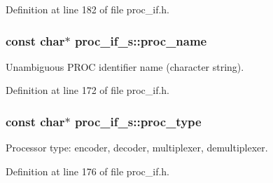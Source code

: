 Definition at line 182 of file proc\+\_\+if.\+h.

\subsubsection[{\texorpdfstring{proc\+\_\+name}{proc_name}}]{\setlength{\rightskip}{0pt plus 5cm}const char$\ast$ proc\+\_\+if\+\_\+s\+::proc\+\_\+name}\hypertarget{structproc__if__s_aa284f1d0bdde2fae0b51101f658430ee}{}\label{structproc__if__s_aa284f1d0bdde2fae0b51101f658430ee}
Unambiguous P\+R\+OC identifier name (character string). 

Definition at line 172 of file proc\+\_\+if.\+h.

\subsubsection[{\texorpdfstring{proc\+\_\+type}{proc_type}}]{\setlength{\rightskip}{0pt plus 5cm}const char$\ast$ proc\+\_\+if\+\_\+s\+::proc\+\_\+type}\hypertarget{structproc__if__s_a3a8a04d2e81ca4dfa55a8526644dd729}{}\label{structproc__if__s_a3a8a04d2e81ca4dfa55a8526644dd729}
Processor type\+: encoder, decoder, multiplexer, demultiplexer. 

Definition at line 176 of file proc\+\_\+if.\+h.

